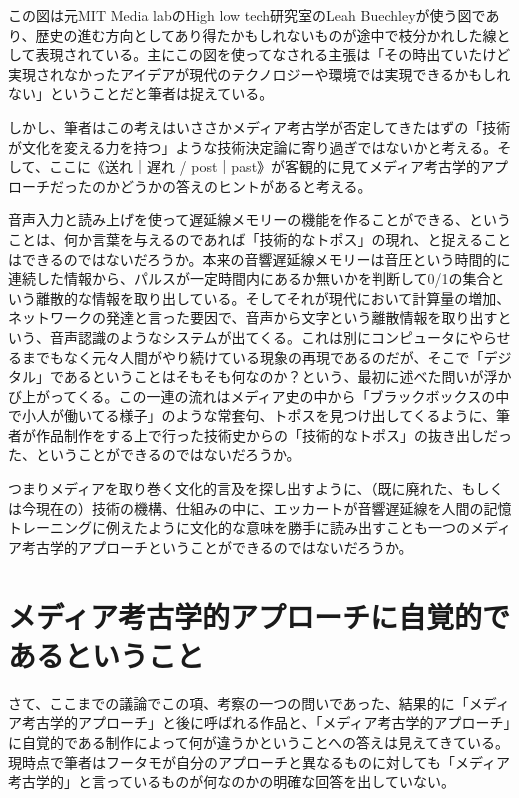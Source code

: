 \documentclass[a4paper,report]{jsbook}
\begin{document}
\autocite{leah:slide}

この図は元MIT Media labのHigh low tech研究室のLeah
Buechleyが使う図であり、歴史の進む方向としてあり得たかもしれないものが途中で枝分かれした線として表現されている。主にこの図を使ってなされる主張は「その時出ていたけど実現されなかったアイデアが現代のテクノロジーや環境では実現できるかもしれない」ということだと筆者は捉えている。

しかし、筆者はこの考えはいささかメディア考古学が否定してきたはずの「技術が文化を変える力を持つ」ような技術決定論に寄り過ぎではないかと考える。そして、ここに《送れ｜遅れ
/
post｜past》が客観的に見てメディア考古学的アプローチだったのかどうかの答えのヒントがあると考える。

音声入力と読み上げを使って遅延線メモリーの機能を作ることができる、ということは、何か言葉を与えるのであれば「技術的なトポス」の現れ、と捉えることはできるのではないだろうか。本来の音響遅延線メモリーは音圧という時間的に連続した情報から、パルスが一定時間内にあるか無いかを判断して0/1の集合という離散的な情報を取り出している。そしてそれが現代において計算量の増加、ネットワークの発達と言った要因で、音声から文字という離散情報を取り出すという、音声認識のようなシステムが出てくる。これは別にコンピュータにやらせるまでもなく元々人間がやり続けている現象の再現であるのだが、そこで「デジタル」であるということはそもそも何なのか？という、最初に述べた問いが浮かび上がってくる。この一連の流れはメディア史の中から「ブラックボックスの中で小人が働いてる様子」のような常套句、トポスを見つけ出してくるように、筆者が作品制作をする上で行った技術史からの「技術的なトポス」の抜き出しだった、ということができるのではないだろうか。

つまりメディアを取り巻く文化的言及を探し出すように、（既に廃れた、もしくは今現在の）技術の機構、仕組みの中に、エッカートが音響遅延線を人間の記憶トレーニングに例えたように文化的な意味を勝手に読み出すことも一つのメディア考古学的アプローチということができるのではないだろうか。

\section{メディア考古学的アプローチに自覚的であるということ}\label{ux30e1ux30c7ux30a3ux30a2ux8003ux53e4ux5b66ux7684ux30a2ux30d7ux30edux30fcux30c1ux306bux81eaux899aux7684ux3067ux3042ux308bux3068ux3044ux3046ux3053ux3068}

さて、ここまでの議論でこの項、考察の一つの問いであった、結果的に「メディア考古学的アプローチ」と後に呼ばれる作品と、「メディア考古学的アプローチ」に自覚的である制作によって何が違うかということへの答えは見えてきている。現時点で筆者はフータモが自分のアプローチと異なるものに対しても「メディア考古学的」と言っているものが何なのかの明確な回答を出していない。
\end{document}
